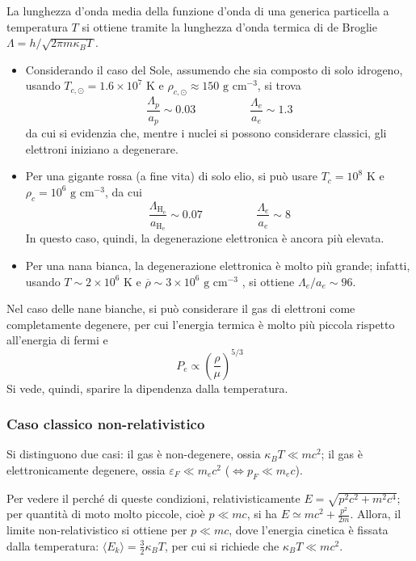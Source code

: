 \documentclass[11pt, a4paper]{scrartcl}
\theoremstyle{style}
\theoremstyle{style1}
\newenvironment{boxenv}[1][]{
    \begin{eqbox}[#1]
    }{
   \end{eqbox}
}
\numberwithin{equation}{subsection}
\begin{document}
La lunghezza d'onda media della funzione d'onda di una generica particella a temperatura $T$ si ottiene tramite la lunghezza d'onda termica di de Broglie $\Lambda = h / \sqrt{2 \pi m \kappa  _B T } $.
\begin{itemize}
	\item Considerando il caso del Sole, assumendo che sia composto di solo idrogeno, usando $T_{c,\odot } = 1.6 \times 10 ^{ 7 }$ K e $\rho _{c , \odot } \approx 150 \text{ g  cm}^{-3}$, si trova 
\[
\frac{\Lambda _p}{a_p} \sim 0.03 \hspace{2cm} \frac{\Lambda _e}{a_e} \sim 1.3
\] 
da cui si evidenzia che, mentre i nuclei si possono considerare classici, gli elettroni iniziano a degenerare.
\item Per una gigante rossa (a fine vita) di solo elio, si pu\`o usare $T_c = 10 ^8$ K e $\rho _c = 10^6 \text{ g cm}^{-3}$, da cui
	\[
	\frac{\Lambda _\mathrm{H_e}  }{a_\mathrm{H_e} } \sim 0.07 \hspace{2cm} \frac{\Lambda _e}{a_e} \sim 8
	\] 
	In questo caso, quindi, la degenerazione elettronica \`e ancora pi\`u elevata.
\item Per una nana bianca, la degenerazione elettronica \`e molto pi\`u grande; infatti, usando $T\sim 2 \times 10^{6}$ K e $\overline{\rho }\sim 3 \times 10^6 \text{ g cm}^{-3}$ , si ottiene $\Lambda _e / a_e \sim 96$.
\end{itemize}
Nel caso delle nane bianche, si pu\`o considerare il gas di elettroni come completamente degenere, per cui l'energia termica \`e molto pi\`u piccola rispetto all'energia di fermi e
\[
P_e \propto \left(\frac{\rho }{\mu }\right) ^{5 / 3}
\] 
Si vede, quindi, sparire la dipendenza dalla temperatura.

\subsubsection{Caso classico non-relativistico}

Si distinguono due casi: il gas \`e non-degenere, ossia $\kappa _B T \ll mc^2 $; il gas \`e elettronicamente degenere, ossia $\varepsilon _F \ll m_e c^2$ ($\Leftrightarrow p_F \ll m_e c$).
\begin{boxenv}[]
Per vedere il perch\'e di queste condizioni, relativisticamente $E = \sqrt{p^2 c^2 + m^2 c^4} $; per quantit\`a di moto molto piccole, cio\`e $p \ll m c$, si ha $E \simeq mc^2 + \frac{p^2}{2m}$. 
Allora, il limite non-relativistico si ottiene per $p \ll m c$, dove l'energia cinetica \`e fissata dalla temperatura: $\langle E_k \rangle = \frac{3}{2} \kappa _B T $, per cui si richiede che $\kappa _B T \ll mc^2$.
\end{boxenv}
\end{document}
